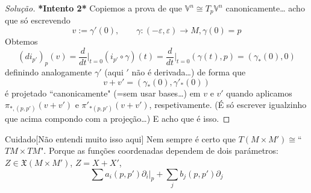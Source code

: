 \begin{remark}
\begin{proof}[Solução]
\textbf{*Intento 2*} Copiemos a prova de que \(\mathbb{V}^n \cong T_p\mathbb{V}^n\) canonicamente… acho que só escrevendo 
\[v:=\gamma'(0), \qquad \gamma:(-\varepsilon,\varepsilon) \longrightarrow M, \gamma(0)=p\]
Obtemos
\[(di_{p'})_{p}(v)=\frac{d}{dt}\Big|_{t=0}(i_{p'} \circ \gamma)(t)=\frac{d}{dt}\Big|_{t=0}(\gamma(t),p)=(\gamma_*(0),0)\]
definindo analogamente \(\gamma'\) (aqui \('\) não é derivada…) de forma que
\[v+v'=(\gamma_*(0),\gamma'_*(0))\]
é projetado ``canonicamente" (=sem usar bases…) em \(v\) e \(v'\) quando aplicamos \(\pi_{*,(p,p')}(v+v')\) e \(\pi'_{*(p,p')}(v+v')\), respetivamente. (É só escrever igualzinho que acima compondo com a projeção…) E acho que é isso.
\end{proof}
\end{remark}

\begin{thing7}{Cuidado}[Não entendi muito isso aqui]\leavevmode
Nem sempre é certo que \(T(M \times M') \cong \)``\(TM \times TM\)". Porque as funções coordenadas dependem de dois parámetros: \(Z \in \mathfrak{X}(M \times M')\), \(Z=X+X'\),
 \[\sum a_i(p,p')\partial_i|_{p}+\sum_{j}b_j(p,p') \partial_j\]
\end{thing7}

